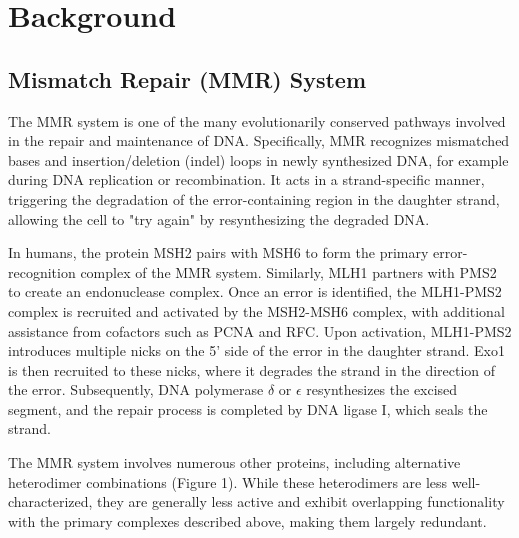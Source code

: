 \documentclass[fleqn,10pt]{olplainarticle}
\begin{document}
\section{Background}

\subsection{Mismatch Repair (MMR) System}

The MMR system is one of the many evolutionarily conserved pathways involved in the repair and maintenance of DNA. Specifically, MMR recognizes mismatched bases and insertion/deletion (indel) loops in newly synthesized DNA, for example during DNA replication or recombination. It acts in a strand-specific manner, triggering the degradation of the error-containing region in the daughter strand, allowing the cell to "try again" by resynthesizing the degraded DNA.

In humans, the protein MSH2 pairs with MSH6 to form the primary error-recognition complex of the MMR system. Similarly, MLH1 partners with PMS2 to create an endonuclease complex. Once an error is identified, the MLH1-PMS2 complex is recruited and activated by the MSH2-MSH6 complex, with additional assistance from cofactors such as PCNA and RFC. Upon activation, MLH1-PMS2 introduces multiple nicks on the 5' side of the error in the daughter strand. Exo1 is then recruited to these nicks, where it degrades the strand in the direction of the error. Subsequently, DNA polymerase $\delta$ or $\epsilon$ resynthesizes the excised segment, and the repair process is completed by DNA ligase I, which seals the strand.

The MMR system involves numerous other proteins, including alternative heterodimer combinations (Figure 1). While these heterodimers are less well-characterized, they are generally less active and exhibit overlapping functionality with the primary complexes described above, making them largely redundant.
\end{document}
